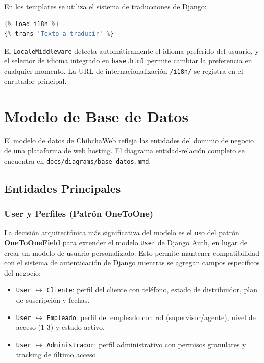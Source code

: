 \documentclass[12pt, a4paper]{article}
\begin{document}
En los templates se utiliza el sistema de traducciones de Django:

\begin{lstlisting}[language=Python, caption={Uso de traducciones en templates}]
{% load i18n %}
{% trans 'Texto a traducir' %}
\end{lstlisting}

El \texttt{LocaleMiddleware} detecta automáticamente el idioma preferido del usuario, y el selector de idioma integrado en \texttt{base.html} permite cambiar la preferencia en cualquier momento. La URL de internacionalización \texttt{/i18n/} se registra en el enrutador principal.

\section{Modelo de Base de Datos}
\label{sec:base-datos}

El modelo de datos de ChibchaWeb refleja las entidades del dominio de negocio de una plataforma de web hosting. El diagrama entidad-relación completo se encuentra en \texttt{docs/diagrams/base\_datos.mmd}.

\subsection{Entidades Principales}

\subsubsection{User y Perfiles (Patrón OneToOne)}

La decisión arquitectónica más significativa del modelo es el uso del patrón \textbf{OneToOneField} para extender el modelo \texttt{User} de Django Auth, en lugar de crear un modelo de usuario personalizado. Esto permite mantener compatibilidad con el sistema de autenticación de Django mientras se agregan campos específicos del negocio:

\begin{itemize}
    \item \texttt{User} $\longleftrightarrow$ \texttt{Cliente}: perfil del cliente con teléfono, estado de distribuidor, plan de suscripción y fechas.
    \item \texttt{User} $\longleftrightarrow$ \texttt{Empleado}: perfil del empleado con rol (supervisor/agente), nivel de acceso (1-3) y estado activo.
    \item \texttt{User} $\longleftrightarrow$ \texttt{Administrador}: perfil administrativo con permisos granulares y tracking de último acceso.
\end{itemize}
\end{document}
